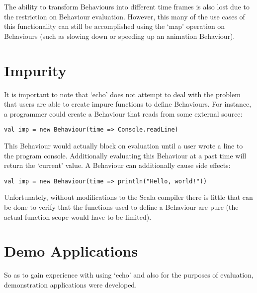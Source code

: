     The ability to transform Behaviours into different time frames is also lost due to the restriction on Behaviour
    evaluation. However, this many of the use cases of this functionality can still be accomplished using the
    `map' operation on Behaviours (such as slowing down or speeding up an animation Behaviour).
  
  \section{Impurity}
    It is important to note that `echo' does not attempt to deal with the problem that
    users are able to create impure functions to define Behaviours. For instance, a programmer could
    create a Behaviour that reads from some external source:

\begin{verbatim}
val imp = new Behaviour(time => Console.readLine)
\end{verbatim}    

    This Behaviour would actually block on evaluation until a user wrote a line to the program console. 
    Additionally evaluating this Behaviour at a past time will return the `current' value. A
    Behaviour can additionally cause side effects:

\begin{verbatim}    
val imp = new Behaviour(time => println("Hello, world!"))
\end{verbatim}

    Unfortunately, without modifications to the Scala compiler there is little that can be done
    to verify that the functions used to define a Behaviour are pure (the actual function scope would
    have to be limited).
  
  \section{Demo Applications}
    So as to gain experience with using `echo' and also for the purposes of evaluation, demonstration
    applications were developed. 
    
